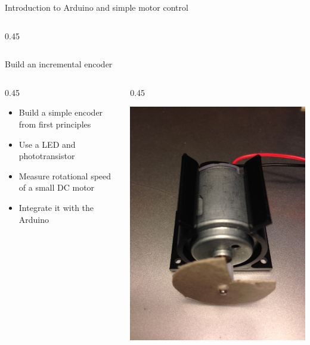 \documentclass[compress]{beamer}
\begin{document}
\begin{frame}{Introduction to Arduino and simple motor control}
\begin{columns}
\begin{column}{0.45\linewidth}
        \end{column}
    \end{columns}
\end{frame}


\begin{frame}{Build an incremental encoder}
    \begin{columns}
        \begin{column}{0.45\linewidth}

            \begin{itemize}
                    \item Build a simple encoder from first principles
                    \item Use a LED and phototransistor
                    \item Measure rotational speed of a small DC motor
                    \item Integrate it with the Arduino
            \end{itemize}
        \end{column}
        \begin{column}{0.45\linewidth}

            \begin{center}
                \includegraphics[width=0.9\columnwidth]{encoder}\\
            \end{center}

        \end{column}
    \end{columns}
\end{frame}
\end{document}
